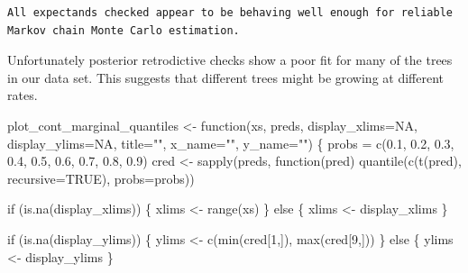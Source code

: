 \documentclass[
  letterpaper,
  DIV=11,
  numbers=noendperiod]{scrartcl}
\newenvironment{Shaded}{\begin{snugshade}}{\end{snugshade}}
\newcommand{\AttributeTok}[1]{\textcolor[rgb]{0.40,0.45,0.13}{#1}}
\newcommand{\ConstantTok}[1]{\textcolor[rgb]{0.56,0.35,0.01}{#1}}
\newcommand{\ControlFlowTok}[1]{\textcolor[rgb]{0.00,0.23,0.31}{#1}}
\newcommand{\DecValTok}[1]{\textcolor[rgb]{0.68,0.00,0.00}{#1}}
\newcommand{\FloatTok}[1]{\textcolor[rgb]{0.68,0.00,0.00}{#1}}
\newcommand{\FunctionTok}[1]{\textcolor[rgb]{0.28,0.35,0.67}{#1}}
\newcommand{\NormalTok}[1]{\textcolor[rgb]{0.00,0.23,0.31}{#1}}
\newcommand{\OtherTok}[1]{\textcolor[rgb]{0.00,0.23,0.31}{#1}}
\newcommand{\StringTok}[1]{\textcolor[rgb]{0.13,0.47,0.30}{#1}}
\begin{document}
\begin{verbatim}
All expectands checked appear to be behaving well enough for reliable
Markov chain Monte Carlo estimation.
\end{verbatim}

Unfortunately posterior retrodictive checks show a poor fit for many of
the trees in our data set. This suggests that different trees might be
growing at different rates.

\begin{Shaded}
\begin{Highlighting}[]
\NormalTok{plot\_cont\_marginal\_quantiles }\OtherTok{\textless{}{-}} \ControlFlowTok{function}\NormalTok{(xs, preds,}
                                         \AttributeTok{display\_xlims=}\ConstantTok{NA}\NormalTok{,}
                                         \AttributeTok{display\_ylims=}\ConstantTok{NA}\NormalTok{,}
                                         \AttributeTok{title=}\StringTok{""}\NormalTok{,}
                                         \AttributeTok{x\_name=}\StringTok{""}\NormalTok{, }\AttributeTok{y\_name=}\StringTok{""}\NormalTok{) \{}
\NormalTok{  probs }\OtherTok{=} \FunctionTok{c}\NormalTok{(}\FloatTok{0.1}\NormalTok{, }\FloatTok{0.2}\NormalTok{, }\FloatTok{0.3}\NormalTok{, }\FloatTok{0.4}\NormalTok{, }\FloatTok{0.5}\NormalTok{, }\FloatTok{0.6}\NormalTok{, }\FloatTok{0.7}\NormalTok{, }\FloatTok{0.8}\NormalTok{, }\FloatTok{0.9}\NormalTok{)}
\NormalTok{  cred }\OtherTok{\textless{}{-}} \FunctionTok{sapply}\NormalTok{(preds, }\ControlFlowTok{function}\NormalTok{(pred)}
                        \FunctionTok{quantile}\NormalTok{(}\FunctionTok{c}\NormalTok{(}\FunctionTok{t}\NormalTok{(pred), }\AttributeTok{recursive=}\ConstantTok{TRUE}\NormalTok{),}
                        \AttributeTok{probs=}\NormalTok{probs))}

  \ControlFlowTok{if}\NormalTok{ (}\FunctionTok{is.na}\NormalTok{(display\_xlims)) \{}
\NormalTok{    xlims }\OtherTok{\textless{}{-}} \FunctionTok{range}\NormalTok{(xs)}
\NormalTok{  \} }\ControlFlowTok{else}\NormalTok{ \{}
\NormalTok{    xlims }\OtherTok{\textless{}{-}}\NormalTok{ display\_xlims}
\NormalTok{  \}}

  \ControlFlowTok{if}\NormalTok{ (}\FunctionTok{is.na}\NormalTok{(display\_ylims)) \{}
\NormalTok{    ylims }\OtherTok{\textless{}{-}} \FunctionTok{c}\NormalTok{(}\FunctionTok{min}\NormalTok{(cred[}\DecValTok{1}\NormalTok{,]), }\FunctionTok{max}\NormalTok{(cred[}\DecValTok{9}\NormalTok{,]))}
\NormalTok{  \} }\ControlFlowTok{else}\NormalTok{ \{}
\NormalTok{    ylims }\OtherTok{\textless{}{-}}\NormalTok{ display\_ylims}
\NormalTok{  \}}


\end{Highlighting}
\end{Shaded}
\end{document}
